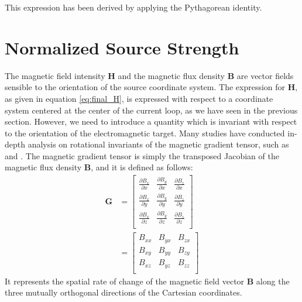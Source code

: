 This expression has been derived by applying the Pythagorean identity.

\section{Normalized Source Strength}
The magnetic field intensity $\mathbf{H}$ and the magnetic flux density $\mathbf{B}$ are vector fields 
sensible to the orientation of the source coordinate system. 
The expression for $\mathbf{H}$, as given in equation \ref{eq:final_H}, is expressed with respect to a 
coordinate system centered at the center of the current loop, as we have seen in the previous section.
However, we need to introduce a quantity which is invariant with
respect to the orientation of the electromagnetic target.
Many studies have conducted in-depth analysis on rotational invariants of the magnetic gradient tensor,
such as \cite{multiple_plots} and \cite{multiple_real_plots_invariants}.
The magnetic gradient tensor is simply the transposed Jacobian of the magnetic flux density $\mathbf{B}$, and it is defined
as follows:
\begin{equation}
\begin{aligned}
\mathbf{G} &= 
\begin{bmatrix}
    \frac{\partial B_x}{\partial x} & \frac{\partial B_y}{\partial x} & \frac{\partial B_z}{\partial x}\\
    \frac{\partial B_x}{\partial y} & \frac{\partial B_y}{\partial y} & \frac{\partial B_z}{\partial y}\\
    \frac{\partial B_x}{\partial z} & \frac{\partial B_y}{\partial z} & \frac{\partial B_z}{\partial z}\\
\end{bmatrix}
\\
&=
\begin{bmatrix}
    B_{xx} & B_{yx} & B_{zx}\\
    B_{xy} & B_{yy} & B_{zy}\\
    B_{xz} & B_{yz} & B_{zz}\\
\end{bmatrix}
\end{aligned}
\label{eq:Jacobian}
\end{equation}
It represents the spatial rate of change of the magnetic field vector $\mathbf{B}$
along the three mutually orthogonal directions of the Cartesian coordinates.

